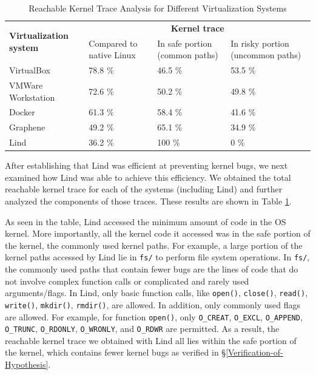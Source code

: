 \begin{table}
\centering
\scriptsize
\caption{Reachable Kernel Trace Analysis for Different Virtualization
Systems}
\begin{tabular}{|l|l|l|l|}
  \hline
  \multirow{3}{1.5cm}{\bf Virtualization system} & \multicolumn{3}{c|}{\bf Kernel trace} \\ \cline{2-4}
  & \multirow{2}{1.5cm}{Compared to native Linux} & \multirow{2}{1.5cm}{In safe portion 
  (common paths)} & \multirow{2}{1cm}{In risky portion (uncommon paths)} \\
  & & & \\  \hline
  VirtualBox & 78.8 \% & 46.5 \% & 53.5 \% \\
  \hline
  \multirow{2}{1.5cm}{VMWare Workstation} & \multirow{2}{*}{72.6 \%} & 
  \multirow{2}{*}{50.2 \%} & \multirow{2}{*}{49.8 \%} \\ 
  & & & \\   \hline
  Docker & 61.3 \% & 58.4 \% & 41.6 \% \\
  \hline
  Graphene & 49.2 \% & 65.1 \% & 34.9 \% \\
  \hline
  Lind & 36.2 \% & 100 \% & 0 \% \\
  \hline
\end{tabular}
\label{table:trace-systems}
\end{table}

After establishing that Lind was efficient at preventing kernel bugs, we next 
examined how Lind was able to achieve this efficiency.  
We obtained the total reachable kernel trace for
each of the systems (including Lind) 
and further analyzed the components of those traces. These results
are shown in Table \ref{table:trace-systems}.

As seen in the table, Lind accessed the minimum amount of code in the OS
kernel. More importantly, 
all the kernel code it accessed was in the safe portion of the kernel, the
commonly used kernel paths. 
For example, a large portion of the kernel paths accessed by Lind lie in 
\texttt{fs/} to perform file system operations. 
In \texttt{fs/}, the commonly used paths that contain 
fewer bugs are the lines of code that do not involve complex function calls 
or complicated and rarely used arguments/flags. In Lind, only basic function calls, 
like \texttt{open()}, \texttt{close()}, \texttt{read()}, \texttt{write()}, \texttt{mkdir()}, 
\texttt{rmdir()}, are allowed. In addition, only commonly used flags are allowed. 
For example, for function \texttt{open()}, only 
\texttt{O\_CREAT}, \texttt{O\_EXCL}, \texttt{O\_APPEND}, \texttt{O\_TRUNC}, 
\texttt{O\_RDONLY}, \texttt{O\_WRONLY}, and \texttt{O\_RDWR} are permitted. 
As a result, the reachable kernel trace we obtained with Lind all lies within the safe 
portion of the kernel, which contains fewer kernel bugs
as verified in \S{\ref{Verification-of-Hypothesis}}. 

